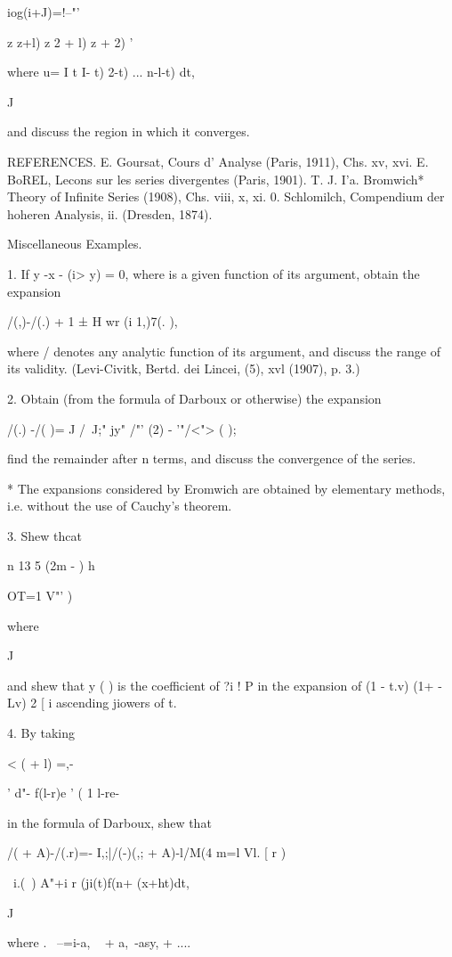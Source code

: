 {{iog(i+J)=!--"'

z z+l) z 2 + l) z + 2) '

where u= I t I- t) 2-t) ... n-l-t) dt,

J

and discuss the region in which it converges. 

REFERENCES. E. Goursat, Cours d' Analyse (Paris, 1911), Chs. xv, xvi.
E. BoREL, Lecons sur les series divergentes (Paris, 1901). T. J. I'a.
Bromwich* Theory of Infinite Series (1908), Chs. viii, x, xi. 0.
Schlomilch, Compendium der hoheren Analysis, ii. (Dresden, 1874).

Miscellaneous Examples.

1. If y -x - (i> y) = 0, where is a given function of its argument,
obtain the expansion

/(,)-/(.) + 1 ± H wr (i 1,)7(. ),

where / denotes any analytic function of its argument, and discuss the
range of its validity. (Levi-Civitk, Bertd. dei Lincei, (5), xvl
(1907), p. 3.)

2. Obtain (from the formula of Darboux or otherwise) the expansion

/(.) -/( )= J /~J;" jy" /"' (2) - '"/<"> ( );

find the remainder after n terms, and discuss the convergence of the
series.

* The expansions considered by Eromwich are obtained by elementary
methods, i.e. without the use of Cauchy's theorem.

%
%

3. Shew thcat

n 13 5 (2m - ) h

OT=1 V"' )

where

J

and shew that y ( ) is the coefficient of ?i ! P in the expansion of
(1 - t.v) (1+ - Lv) 2 [ i ascending jiowers of t.

4. By taking

< ( + l) =,-

' d"- f(l-r)e ' ( 1 l-re-

in the formula of Darboux, shew that

/( + A)-/(.r)=- I,;|/(-)(,; + A)-l/M(4 m=l Vl. [ r )

\ i.(\ ) A"+i r (ji(t)f(n+ (x+ht)dt,

J

where . \ --=i-a, ~ + a,~-asy, + ....

}}
